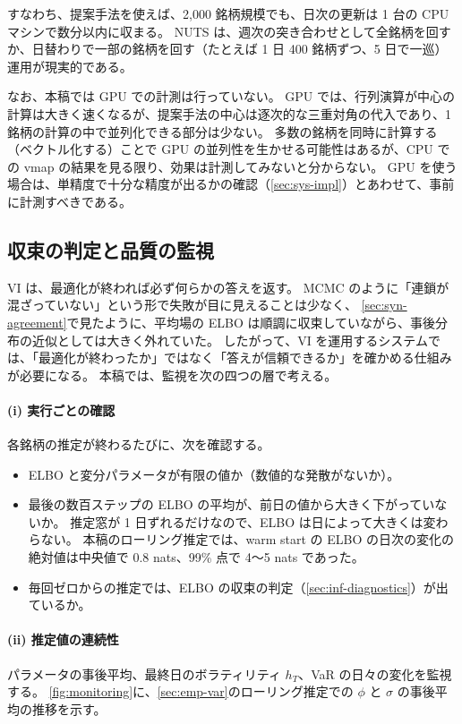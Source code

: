 すなわち、提案手法を使えば、2,000 銘柄規模でも、日次の更新は 1 台の CPU マシンで数分以内に収まる。
NUTS は、週次の突き合わせとして全銘柄を回すか、日替わりで一部の銘柄を回す（たとえば 1 日 400 銘柄ずつ、5 日で一巡）運用が現実的である。


なお、本稿では GPU での計測は行っていない。
GPU では、行列演算が中心の計算は大きく速くなるが、提案手法の中心は逐次的な三重対角の代入であり、1 銘柄の計算の中で並列化できる部分は少ない。
多数の銘柄を同時に計算する（ベクトル化する）ことで GPU の並列性を生かせる可能性はあるが、CPU での vmap の結果を見る限り、効果は計測してみないと分からない。
GPU を使う場合は、単精度で十分な精度が出るかの確認（\cref{sec:sys-impl}）とあわせて、事前に計測すべきである。

\subsection{収束の判定と品質の監視}\label{sec:sys-monitor}

VI は、最適化が終われば必ず何らかの答えを返す。
MCMC のように「連鎖が混ざっていない」という形で失敗が目に見えることは少なく、
\cref{sec:syn-agreement}で見たように、平均場の ELBO は順調に収束していながら、事後分布の近似としては大きく外れていた。
したがって、VI を運用するシステムでは、「最適化が終わったか」ではなく「答えが信頼できるか」を確かめる仕組みが必要になる。
本稿では、監視を次の四つの層で考える。

\paragraph{(i) 実行ごとの確認}
各銘柄の推定が終わるたびに、次を確認する。
\begin{itemize}
  \item ELBO と変分パラメータが有限の値か（数値的な発散がないか）。
  \item 最後の数百ステップの ELBO の平均が、前日の値から大きく下がっていないか。
    推定窓が 1 日ずれるだけなので、ELBO は日によって大きくは変わらない。
    本稿のローリング推定では、warm start の ELBO の日次の変化の絶対値は中央値で 0.8 nats、99\% 点で 4〜5 nats であった。
  \item 毎回ゼロからの推定では、ELBO の収束の判定（\cref{sec:inf-diagnostics}）が出ているか。
\end{itemize}

\paragraph{(ii) 推定値の連続性}
パラメータの事後平均、最終日のボラティリティ $h_T$、VaR の日々の変化を監視する。
\cref{fig:monitoring}に、\cref{sec:emp-var}のローリング推定での $\phi$ と $\sigma$ の事後平均の推移を示す。


